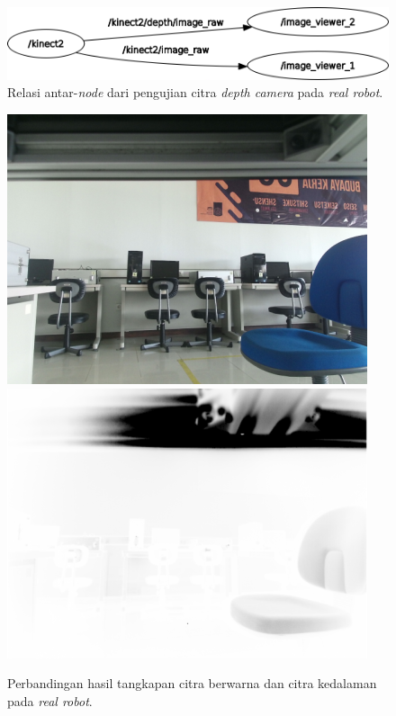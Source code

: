 
\begin{figure}[ht]
  \centering
  \includegraphics[scale=0.35]{gambar/rosgraph-depth-camera.png}
  \caption{Relasi antar-\emph{node} dari pengujian citra \emph{depth camera} pada \emph{real robot}.}
  \label{fig:rosgraphdepthcamera}
\end{figure}


\begin{figure}[ht]
  \centering
  \includegraphics[scale=0.25]{gambar/citra-depth-camera-rgb-robot.png}
  \includegraphics[scale=0.25]{gambar/citra-depth-camera-depth-robot.png}
  \caption{Perbandingan hasil tangkapan citra berwarna dan citra kedalaman pada \emph{real robot}.}
  \label{fig:depthcamerarobot}
\end{figure}
